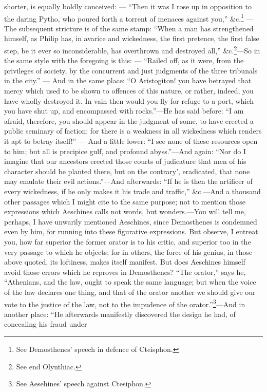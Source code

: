 shorter, is equally boldly conceived: — ``Then it was I rose up in
opposition to the daring Pytho, who poured forth a torrent of menaces
against you,'' \&c.\footnote{See Demosthenes' speech
in defence of Cteisphon.} — The subsequent stricture is of the
same stamp: ``When a man has strengthened himself, as Philip has, in
avarice and wickedness, the first pretence, the first false step, be it
ever so inconsiderable, has overthrown and destroyed all,'' \&c.\footnote{See end Olynthiac.}—So
in the same style with the foregoing is this: — ``Railed off, as it
were, from the privileges of society, by the concurrent and just judgments
of the three tribunals in the city.'' — And in the same place: ``O
Aristogiton! you have betrayed that mercy which used to be shown to
offences of this nature, or rather, indeed, you have wholly destroyed it.
In vain then would you fly for refuge to a port, which you have shut up,
and encompassed with rocks.''—He has said before: ``I am afraid,
therefore, you should appear in the judgment of some, to have erected a
public seminary of faction: for there is a weakness in all wickedness
which renders it apt to betray itself!'' — And a little lower: ``I see
none of these resources open to him; but all is precipice gulf, and
profound abyss.''—And again: ``Nor do I imagine that our ancestors
erected those courts of judicature that men of his character should be
planted there, but on the contrary', eradicated, that none may emulate
their evil actions.''—And afterwards: ``If he is then the artificer of
every wickedness, if he only makes it his trade and traffic,'' \&c.—And
a thousand other passages which I might cite to the same purpose; not to
mention those expressions which Aeschines calls not words, but wonders.—You
will tell me, perhaps, I have unwarily mentioned Aeschines, since
Demosthenes is condemned even by him, for running into these figurative
expressions. But observe, I entreat you, how far superior the former
orator is to his critic, and superior too in the very passage to which he
objects; for in others, the force of his genius, in those above quoted,
its loftiness, makes itself manifest. But does Aeschines himself avoid
those errors which he reproves in Demosthenes? ``The orator,'' says he,
``Athenians, and the law, ought to speak the same language; but when the
voice of the law declares one thing, and that of the orator another we
should give our vote to the justice of the law, not to the impudence of
the orator.''\footnote{See Aesehines' speech
against Ctesiphon.}—And in another place: ``He afterwards
manifestly discovered the design he had, of concealing his fraud under
